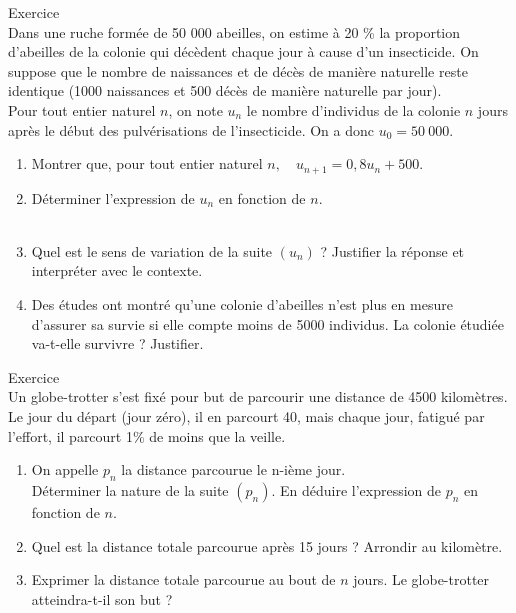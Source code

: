 \documentclass[a4paper,11pt,eval]{nsi}
\newcounter{exoNum}
\newcommand{\exo}[1]
{
	\addtocounter{exoNum}{1}
	{\titlefont\color{UGLiBlue}\Large Exercice\ \theexoNum\ \normalsize{#1}}\smallskip	
}
\begin{document}
\exo{}\\
Dans une ruche formée de 50 000 abeilles, on estime à 20 \% la proportion d'abeilles de la colonie qui décèdent chaque jour à cause d'un insecticide. On suppose que le nombre de naissances et de décès de manière naturelle reste identique (1000 naissances et 500 décès de manière naturelle par jour).\\
Pour tout entier naturel $n$, on note $u_n$ le nombre d'individus de la colonie $n$ jours après le début des pulvérisations de l'insecticide. On a donc $u_0=50\ 000$.
\begin{enumerate}
    \item Montrer que, pour tout entier naturel $n, \quad u_{n+1}=0,8u_n+500$.\\[.5em]
    \item Déterminer l'expression de $u_n$ en fonction de $n$.\\[.5em]
    \\
    \item Quel est le sens de variation de la suite $(u_n)$ ? Justifier la réponse et interpréter avec le contexte.\\[.5em]
    \item Des études ont montré qu'une colonie d'abeilles n'est plus en mesure d'assurer sa survie si elle compte moins de 5000 individus. La colonie étudiée va-t-elle survivre ? Justifier.\\[.5em]
\end{enumerate}

\exo{}\\
Un globe-trotter s'est fixé pour but de parcourir une distance de 4500 kilomètres.\\
Le jour du départ (jour zéro), il en parcourt 40, mais chaque jour, fatigué par l'effort, il parcourt 1\% de moins que la veille.
\begin{enumerate}
	\item 	On appelle $p_n$ la distance parcourue le n-ième jour.\\
	Déterminer la nature de la suite $(p_n)$. En déduire l'expression de $p_n$ en fonction de $n$.\\[0.5em]
    \item Quel est la distance totale parcourue après 15 jours ? Arrondir au kilomètre.\\[0.5em]
	\item 	Exprimer la distance totale parcourue au bout de $n$ jours. Le globe-trotter atteindra-t-il son but ?\\[0.5em]
\end{enumerate}
\end{document}
